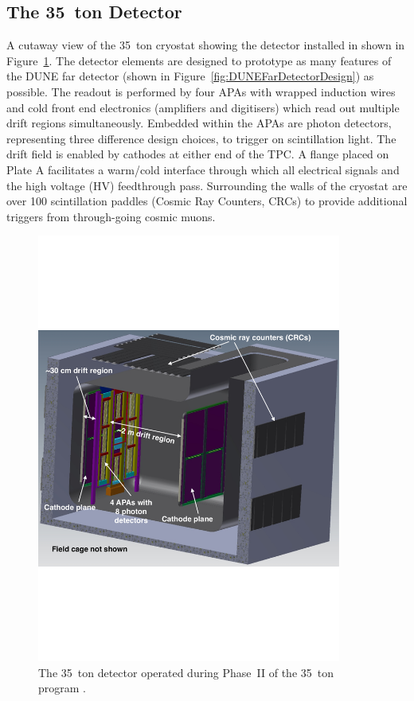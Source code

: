 \subsection{The 35~ton Detector}\label{sec:35tonDetector}

A cutaway view of the 35~ton cryostat showing the detector installed in shown in Figure~\ref{fig:35tonDetector}.  The detector elements are designed to prototype as many features of the DUNE far detector (shown in Figure~\ref{fig:DUNEFarDetectorDesign}) as possible.  The readout is performed by four APAs with wrapped induction wires and cold front end electronics (amplifiers and digitisers) which read out multiple drift regions simultaneously.  Embedded within the APAs are photon detectors, representing three difference design choices, to trigger on scintillation light.  The drift field is enabled by cathodes at either end of the TPC.  A flange placed on Plate A facilitates a warm/cold interface through which all electrical signals and the high voltage (HV) feedthrough pass.  Surrounding the walls of the cryostat are over 100 scintillation paddles (Cosmic Ray Counters, CRCs) to provide additional triggers from through-going cosmic muons.

\begin{figure}
  \centering
  \includegraphics[width=10cm]{35tonDetector.pdf}
  \caption[The 35~ton detector operated during Phase~II of the 35~ton programme.]{The 35~ton detector operated during Phase~II of the 35~ton program \cite{35tonPhaseINeutrino2014}.}
  \label{fig:35tonDetector}
\end{figure}

